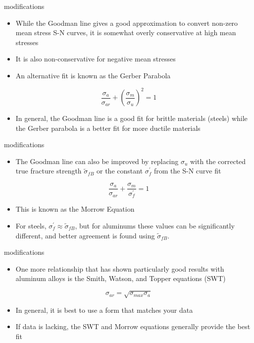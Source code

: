 \documentclass[
  letterpaper,
  ignorenonframetext,
  aspectratio=43,
  handout,
  12pt]{beamer}
\providecommand{\tightlist}{%
  \setlength{\itemsep}{0pt}\setlength{\parskip}{0pt}}
\providecommand{\tightlist}{%
\setlength{\itemsep}{0pt}\setlength{\parskip}{0pt}}
\begin{document}
\begin{frame}{modifications}
\protect\hypertarget{modifications}{}
\begin{itemize}
\tightlist
\item
  While the Goodman line gives a good approximation to convert non-zero
  mean stress S-N curves, it is somewhat overly conservative at high
  mean stresses
\item
  It is also non-conservative for negative mean stresses
\item
  An alternative fit is known as the Gerber Parabola
\end{itemize}

\[\frac{\sigma_a}{\sigma_{ar}} + \left(\frac{\sigma_m}{\sigma_u}\right)^2 = 1\]

\begin{itemize}
\tightlist
\item
  In general, the Goodman line is a good fit for brittle materials
  (steels) while the Gerber parabola is a better fit for more ductile
  materials
\end{itemize}
\end{frame}

\begin{frame}{modifications}
\protect\hypertarget{modifications-1}{}
\begin{itemize}
\tightlist
\item
  The Goodman line can also be improved by replacing \(\sigma_u\) with
  the corrected true fracture strength \(\tilde{\sigma}_{fB}\) or the
  constant \(\sigma_f^\prime\) from the S-N curve fit
\end{itemize}

\[\frac{\sigma_a}{\sigma_{ar}} + \frac{\sigma_m}{\sigma_f^\prime} = 1\]

\begin{itemize}
\tightlist
\item
  This is known as the Morrow Equation
\item
  For steels, \(\sigma_f^\prime \approx \tilde{\sigma}_{fB}\), but for
  aluminums these values can be significantly different, and better
  agreement is found using \(\tilde{\sigma}_{fB}\).
\end{itemize}
\end{frame}

\begin{frame}{modifications}
\protect\hypertarget{modifications-2}{}
\begin{itemize}
\tightlist
\item
  One more relationship that has shown particularly good results with
  aluminum alloys is the Smith, Watson, and Topper equations (SWT)
\end{itemize}

\[\sigma_{ar} = \sqrt{\sigma_{max}\sigma_a}\]

\begin{itemize}
\tightlist
\item
  In general, it is best to use a form that matches your data
\item
  If data is lacking, the SWT and Morrow equations generally provide the
  best fit
\end{itemize}
\end{frame}
\end{document}
